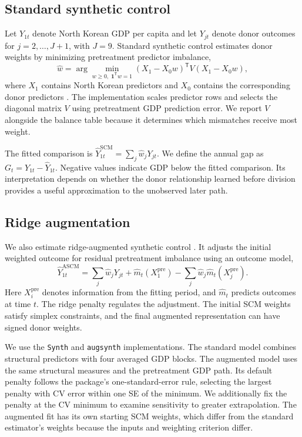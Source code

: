 \documentclass[12pt]{article}
\begin{document}
\subsection{Standard synthetic control}
Let $Y_{1t}$ denote North Korean GDP per capita and let $Y_{jt}$ denote donor outcomes for $j=2,\ldots,J+1$, with $J=9$. Standard synthetic control estimates donor weights by minimizing pretreatment predictor imbalance,
\begin{equation}
 \widehat w=\arg\min_{w\geq0,\;\boldsymbol{1}^{\mathsf T}w=1}
 (X_1-X_0w)^{\mathsf T}V(X_1-X_0w),
\end{equation}
where $X_1$ contains North Korean predictors and $X_0$ contains the corresponding donor predictors \citep{abadie2010synthetic}. The implementation scales predictor rows and selects the diagonal matrix $V$ using pretreatment GDP prediction error. We report $V$ alongside the balance table because it determines which mismatches receive most weight.

The fitted comparison is $\widehat Y_{1t}^{\mathrm{SCM}}=\sum_j\widehat w_jY_{jt}$. We define the annual gap as $G_t=Y_{1t}-\widehat Y_{1t}$. Negative values indicate GDP below the fitted comparison. Its interpretation depends on whether the donor relationship learned before division provides a useful approximation to the unobserved later path.

\subsection{Ridge augmentation}
We also estimate ridge-augmented synthetic control \citep{benmichael2021augmented}. It adjusts the initial weighted outcome for residual pretreatment imbalance using an outcome model,
\begin{equation}
 \widehat Y_{1t}^{\mathrm{ASCM}}
 =\sum_j\widehat w_jY_{jt}
 +\widehat m_t(X_1^{\mathrm{pre}})
 -\sum_j\widehat w_j\widehat m_t(X_j^{\mathrm{pre}}).
\end{equation}
Here $X_i^{\mathrm{pre}}$ denotes information from the fitting period, and $\widehat m_t$ predicts outcomes at time $t$. The ridge penalty regulates the adjustment. The initial SCM weights satisfy simplex constraints, and the final augmented representation can have signed donor weights.

We use the \texttt{Synth} and \texttt{augsynth} implementations. The standard model combines structural predictors with four averaged GDP blocks. The augmented model uses the same structural measures and the pretreatment GDP path. Its default penalty follows the package's one-standard-error rule, selecting the largest penalty with CV error within one SE of the minimum. We additionally fix the penalty at the CV minimum to examine sensitivity to greater extrapolation. The augmented fit has its own starting SCM weights, which differ from the standard estimator's weights because the inputs and weighting criterion differ.
\end{document}
